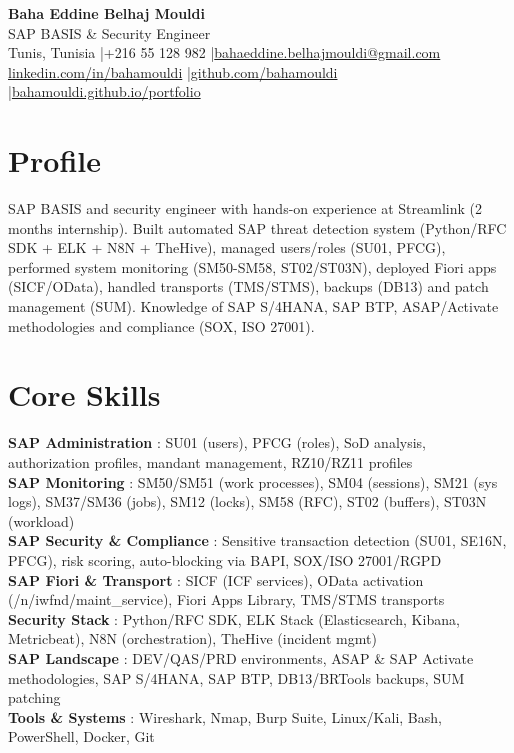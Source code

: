 \documentclass[a4paper,10pt]{article}
\begin{document}
\begin{center}
{\LARGE\bfseries\color{navy} Baha Eddine Belhaj Mouldi}\\[3pt]
{\large SAP BASIS \& Security Engineer}\\[5pt]
Tunis, Tunisia \quad|\quad +216 55 128 982 \quad|\quad \href{mailto:bahaeddine.belhajmouldi@gmail.com}{bahaeddine.belhajmouldi@gmail.com}\\[1pt]
\href{https://www.linkedin.com/in/bahamouldi}{linkedin.com/in/bahamouldi} \quad|\quad \href{https://github.com/bahamouldi}{github.com/bahamouldi} \quad|\quad \href{https://bahamouldi.github.io/portfolio/}{bahamouldi.github.io/portfolio}
\end{center}
\vspace{1pt}
\section{Profile}
SAP BASIS and security engineer with hands-on experience at Streamlink (2 months internship). Built automated SAP threat detection system (Python/RFC SDK + ELK + N8N + TheHive), managed users/roles (SU01, PFCG), performed system monitoring (SM50-SM58, ST02/ST03N), deployed Fiori apps (SICF/OData), handled transports (TMS/STMS), backups (DB13) and patch management (SUM). Knowledge of SAP S/4HANA, SAP BTP, ASAP/Activate methodologies and compliance (SOX, ISO 27001).
\section{Core Skills}
\textbf{SAP Administration} : SU01 (users), PFCG (roles), SoD analysis, authorization profiles, mandant management, RZ10/RZ11 profiles\\[0.5pt]
\textbf{SAP Monitoring} : SM50/SM51 (work processes), SM04 (sessions), SM21 (sys logs), SM37/SM36 (jobs), SM12 (locks), SM58 (RFC), ST02 (buffers), ST03N (workload)\\[0.5pt]
\textbf{SAP Security \& Compliance} : Sensitive transaction detection (SU01, SE16N, PFCG), risk scoring, auto-blocking via BAPI, SOX/ISO 27001/RGPD\\[0.5pt]
\textbf{SAP Fiori \& Transport} : SICF (ICF services), OData activation (/n/iwfnd/maint\_service), Fiori Apps Library, TMS/STMS transports\\[0.5pt]
\textbf{Security Stack} : Python/RFC SDK, ELK Stack (Elasticsearch, Kibana, Metricbeat), N8N (orchestration), TheHive (incident mgmt)\\[0.5pt]
\textbf{SAP Landscape} : DEV/QAS/PRD environments, ASAP \& SAP Activate methodologies, SAP S/4HANA, SAP BTP, DB13/BRTools backups, SUM patching\\[0.5pt]
\textbf{Tools \& Systems} : Wireshark, Nmap, Burp Suite, Linux/Kali, Bash, PowerShell, Docker, Git
\end{document}
